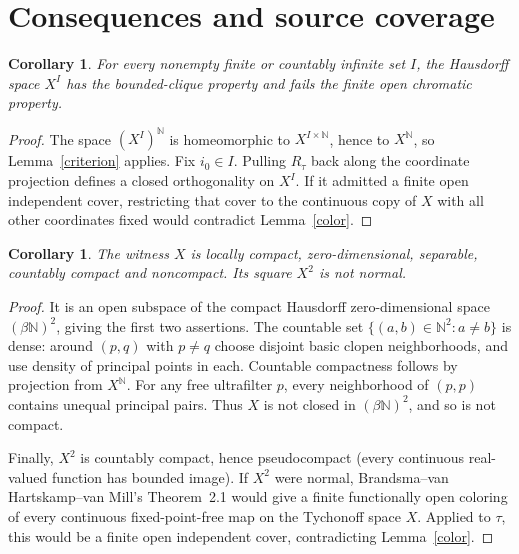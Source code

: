 \documentclass[11pt]{article}
\newtheorem{corollary}[theorem]{Corollary}
\newcommand{\N}{\mathbb N}
\begin{document}
\section{Consequences and source coverage}
\begin{corollary}\label{products}
For every nonempty finite or countably infinite set $I$, the
Hausdorff space $X^I$ has the bounded-clique property and fails
the finite open chromatic property.
\end{corollary}
\begin{proof}
The space $(X^I)^\N$ is homeomorphic to $X^{I\times\N}$, hence
to $X^\N$, so Lemma~\ref{criterion} applies. Fix $i_0\in I$.
Pulling $R_\tau$ back along the coordinate projection defines a
closed orthogonality on $X^I$. If it admitted a finite open independent
cover, restricting that cover to the continuous copy of $X$ with
all other coordinates fixed would contradict Lemma~\ref{color}.
\end{proof}

\begin{corollary}
The witness $X$ is locally compact, zero-dimensional, separable,
countably compact and noncompact. Its square $X^2$ is not normal.
\end{corollary}
\begin{proof}
It is an open subspace of the compact Hausdorff zero-dimensional
space $(\beta\N)^2$, giving the first two assertions. The countable
set $\{(a,b)\in\N^2:a\ne b\}$ is dense: around $(p,q)$ with $p\ne q$
choose disjoint basic clopen neighborhoods, and use density of
principal points in each. Countable compactness follows by projection
from $X^\N$. For any free ultrafilter $p$, every neighborhood of
$(p,p)$ contains unequal principal pairs. Thus $X$ is not closed
in $(\beta\N)^2$, and so is not compact.

Finally, $X^2$ is countably compact, hence pseudocompact (every
continuous real-valued function has bounded image). If $X^2$ were
normal, Brandsma--van Hartskamp--van Mill's Theorem~2.1
\cite[p.~28]{BHM} would give a finite functionally open coloring
of every continuous fixed-point-free map on the Tychonoff space $X$.
Applied to $\tau$, this would be a finite open independent cover,
contradicting Lemma~\ref{color}.
\end{proof}
\end{document}
